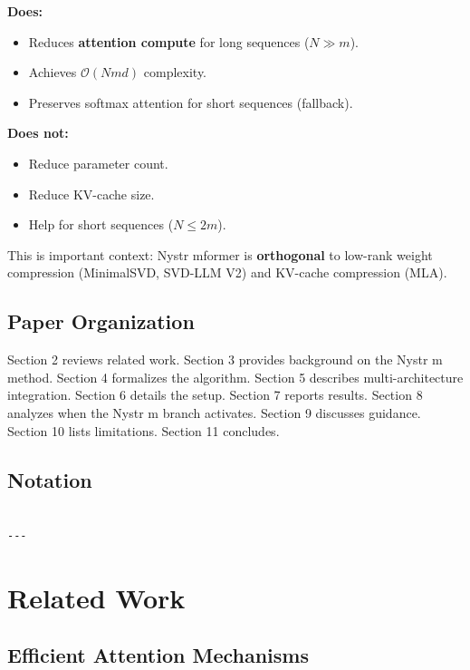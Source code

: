 \textbf{Does:}
\begin{itemize}
\item Reduces \textbf{attention compute} for long sequences ($N \gg m$).
\item Achieves $\mathcal{O}(N m d)$ complexity.
\item Preserves softmax attention for short sequences (fallback).

\end{itemize}
\textbf{Does not:}
\begin{itemize}
\item Reduce parameter count.
\item Reduce KV-cache size.
\item Help for short sequences ($N \leq 2m$).

\end{itemize}
This is important context: Nystr mformer is \textbf{orthogonal} to low-rank 
weight compression (MinimalSVD, SVD-LLM V2) and KV-cache compression (MLA).

\subsection{Paper Organization}

Section 2 reviews related work. Section 3 provides background on the 
Nystr m method. Section 4 formalizes the algorithm. Section 5 describes 
multi-architecture integration. Section 6 details the setup. Section 7 
reports results. Section 8 analyzes when the Nystr m branch activates. 
Section 9 discusses guidance. Section 10 lists limitations. Section 11 
concludes.



\subsection{Notation}

\begin{lstlisting}

---
\end{lstlisting}


\section{Related Work}

\subsection{Efficient Attention Mechanisms}

